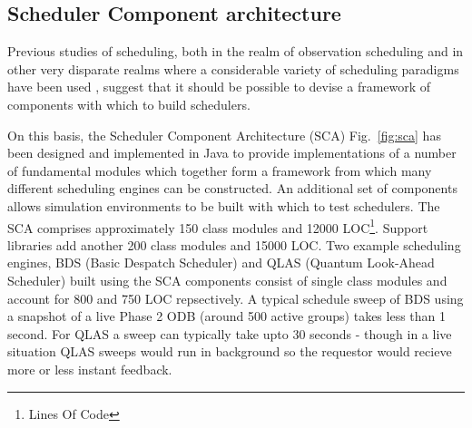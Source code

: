 \documentclass[12pt,a4paper]{article}
\begin{document}
{%
%
\subsection{Scheduler Component architecture}
\label{subsect:sca}
Previous studies of scheduling, both in the realm of observation scheduling \citep{fraser04scheduling, fraser06scheduling} and in other very disparate realms where a considerable variety of scheduling paradigms have been used \citep{wellman03bidding, zhang95reinforcement, popova98adaptive, policella03flexible, kramer03maxflex, hart99immune}, suggest that it should be possible to devise a framework of components with which to build schedulers.

On this basis, the Scheduler Component Architecture (SCA) Fig.~\ref{fig:sca} has been designed and implemented in Java to provide implementations of a number of fundamental modules which together form a framework from which many different scheduling engines can be constructed. An additional set of components allows simulation environments to be built with which to test schedulers. The SCA comprises approximately 150 class modules and 12000 LOC\footnote{Lines Of Code}. Support libraries add another 200 class modules and 15000 LOC. Two example scheduling engines, BDS (Basic Despatch Scheduler) and QLAS (Quantum Look-Ahead Scheduler) built using the SCA components consist of single class modules and account for 800 and 750 LOC repsectively. A typical schedule sweep of BDS using a snapshot of a live Phase 2 ODB (around 500 active groups) takes less than 1 second. For QLAS a sweep can typically take upto 30 seconds - though in a live situation QLAS sweeps would run in background so the requestor would recieve more or less instant feedback.   

}
\end{document}
